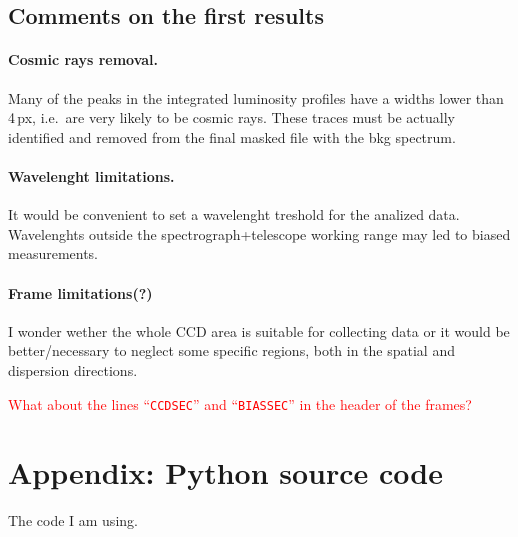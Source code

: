 \documentclass{article}
\begin{document}
\subsection{Comments on the first results}

\paragraph{Cosmic rays removal.} Many of the peaks in the integrated luminosity profiles have a widths lower than 4\,px, i.e.\ are very likely to be cosmic rays. These traces must be actually identified and removed from the final masked file with the bkg spectrum.

\paragraph{Wavelenght limitations.} It would be convenient to set a wavelenght treshold for the analized data. Wavelenghts outside the spectrograph+telescope working range may led to biased measurements.

\paragraph{Frame limitations(?)} I wonder wether the whole CCD area is suitable for collecting data or it would be better/necessary to neglect some specific regions, both in the spatial and dispersion directions.

\textcolor{red}{What about the lines ``\texttt{CCDSEC}'' and ``\texttt{BIASSEC}'' in the header of the frames?}

\newpage
\section{Appendix: Python source code}
The code I am using.

\end{document}
